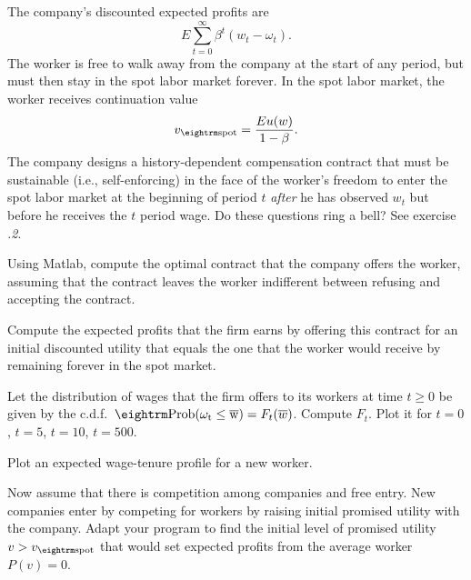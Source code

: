 The company's discounted expected profits
are
$$ E \sum_{t=0}^\infty \beta^t \left(w_t - \omega_t\right).$$ %
The worker is free to walk away from the company at the start of
any period, but must then stay in the spot labor market forever.
In the spot labor market, the worker receives continuation value
$$ v_{\rm spot} = {E  u(w) \over 1 -\beta}.  $$
The company designs a history-dependent compensation contract
that must be sustainable (i.e., self-enforcing) in the face of
the worker's freedom to enter the spot labor market at
the beginning of period $t$ {\it after\/} he has observed
$w_t$ but before he receives the $t$ period wage.
\medskip
{}  Do these questions  ring a bell? See
exercise {\it \the\chapternum.2\/}.

\medskip
{} Using Matlab, compute the optimal contract that the
company offers the worker, assuming that the contract leaves the worker
indifferent between refusing and accepting the contract.

\medskip
{}  Compute the expected profits that the firm earns by
offering this contract for an initial discounted utility that equals the
one that the worker would receive by remaining forever in the spot market.

\medskip
{}  Let the distribution of wages that the firm offers to
its workers  at time $t \geq 0$ be given by the c.d.f.\
${\rm Prob ( \omega_t \leq \overline w)}
= F_t (\overline w)$.  Compute $F_t$.  Plot it for
$t=0$, $t=5$, $t=10$, $t=500$.

\medskip
{}  Plot an expected wage-tenure profile
for a new worker.

\medskip
{}  Now assume that there is competition among
companies and free entry.  New companies enter by competing for
workers by raising initial promised utility with the company.
Adapt your program to find the initial level of promised utility
$v > v_{\rm spot}$ that would set expected profits from the
average worker $P(v)=0$.


